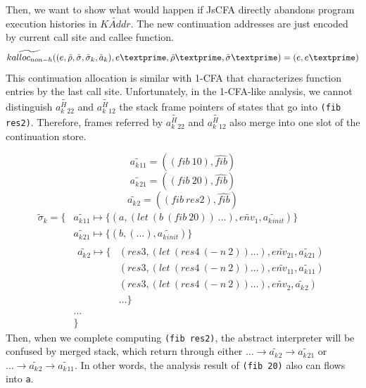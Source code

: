 \documentclass{article}
\begin{document}
Then, we want to show what would happen if JsCFA directly abandons program execution histories in $\widetilde{KAddr}$. The new continuation addresses are just encoded by current call site and callee function.
\[
\widetilde{kalloc_{non-h}} ((e, \tilde{\rho}, \tilde{\sigma}, \tilde{\sigma}_k, \tilde{a}_k), e\textprime, \tilde{\rho}\textprime, \tilde{\sigma}\textprime) =
(e, e\textprime)
\]
This continuation allocation is similar with 1-CFA that characterizes function entries by the last call site. Unfortunately, in the 1-CFA-like analysis, we cannot distinguish $\widetilde{a^H_k{}_{22}}$ and $\widetilde{a^H_k{}_{12}}$ the stack frame pointers of states that go into \verb|(fib res2)|. Therefore, frames referred by $\widetilde{a^H_k{}_{22}}$ and $\widetilde{a^H_k{}_{12}}$ also merge into one slot of the continuation store.

\[
\widetilde{a_k{}_{11}} = ((fib\ 10), \widehat{fib})
\]
\[
\widetilde{a_k{}_{21}} = ((fib\ 20), \widehat{fib})
\]
\[
\widetilde{a_k{}_{2}} = ((fib\ res2), \widehat{fib})
\]
\[
\begin{aligned}
\tilde{\sigma}_k = \{ {}& \widetilde{a_k{}_{11}} \mapsto \{(a, (let\ (b\ (fib\ 20))\ \dots), \widetilde{env_1}, \widetilde{a_k{}_{init}})\}  {} \\
                            & \widetilde{a_k{}_{21}} \mapsto \{(b, (\dots), \widetilde{a_k{}_{init}}) \} {}\\
                            &
                            \begin{aligned}
                              \widetilde{a_k{}_{2}} \mapsto
                              \{{}& (res3, (let\ (res4\ (-\ n\ 2)) \dots), \widetilde{env_{21}}, \widetilde{a_k{}_{21}}) {}\\
                              & (res3, (let\ (res4\ (-\ n\ 2)) \dots), \widetilde{env_{11}}, \widetilde{a_k{}_{11}}) {}\\
                              & (res3, (let\ (res4\ (-\ n\ 2)) \dots), \widetilde{env_2}, \widetilde{a_k{}_{2}}) {} \\
                              & \dots
                              \}
                            \end{aligned} {}\\
                            & \dots {}\\
                            & \}
\end{aligned}
\]
Then, when we complete computing \verb|(fib res2)|, the abstract interpreter will be confused by merged stack, which return through either $\dots \to \widetilde{a_k{}_{2}} \to \widetilde{a_k{}_{21}}$ or $\dots \to \widetilde{a_k{}_{2}} \to \widetilde{a_k{}_{11}}$. In other words, the analysis result of \verb|(fib 20)| also can flows into \verb|a|.
\end{document}
